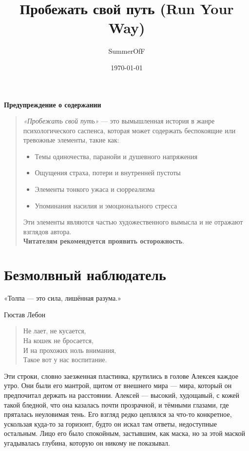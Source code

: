 \documentclass[12pt,a4paper]{book}
\title{Пробежать свой путь (Run Your Way)}
\author{SummerOfF}
\date{\today}
\begin{document}
\maketitle
\clearpage %
\begin{center}
    \vspace*{2cm}
    {\Large \textbf{Предупреждение о содержании}} \\
    \vspace{1cm}
\end{center}

\begin{quote}
\textit{«Пробежать свой путь»} --- это вымышленная история в жанре психологического саспенса, которая может содержать беспокоящие или тревожные элементы, такие как:
\begin{itemize}
    \item Темы одиночества, паранойи и душевного напряжения
    \item Ощущения страха, потери и внутренней пустоты
    \item Элементы тонкого ужаса и сюрреализма
    \item Упоминания насилия и эмоционального стресса
\end{itemize}

Эти элементы являются частью художественного вымысла и не отражают взглядов автора. \\
\textbf{Читателям рекомендуется проявить осторожность}.
\end{quote}

\clearpage %
\tableofcontents
\clearpage

\chapter{Безмолвный наблюдатель}
\epigraph{«Толпа --- это сила, лишённая разума.»}{Гюстав Лебон}
\begin{verse}
Не лает, не кусается,\\
На кошек не бросается,\\
И на прохожих ноль внимания,\\
Такое вот у нас воспитание.
\end{verse}

Эти строки, словно заезженная пластинка, крутились в голове Алексея каждое утро. Они были его мантрой, щитом от внешнего мира --- мира, который он предпочитал держать на расстоянии. Алексей --- высокий, худощавый, с кожей такой бледной, что она казалась почти прозрачной, и тёмными глазами, где пряталась неуловимая тень. Его взгляд редко цеплялся за что-то конкретное, ускользая куда-то за горизонт, будто он искал там ответы, недоступные остальным. Лицо его было спокойным, застывшим, как маска, но за этой маской угадывалась глубина, которую он никому не показывал.
\end{document}
